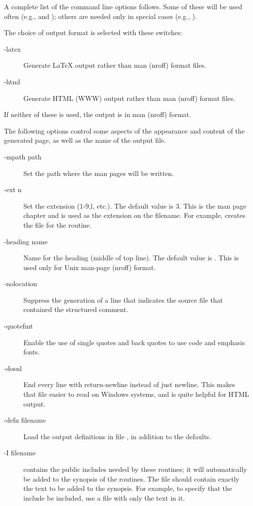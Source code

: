 \documentclass[twoside]{linfoem}
\begin{document}
A complete list of the command line options follows.  Some of these will
be used often (e.g.,  and ); others are
needed only in special cases (e.g., ).

The choice of output format is selected with these switches:
\begin{description}
\item[-latex]
Generate LaTeX output rather than man (nroff) format files.
\item[-html]
Generate HTML (WWW) output rather than man (nroff) format files.
\end{description}
If neither of these is used, the output is in man (nroff) format.

The following options control some aspects of the appearance and content of the
generated page, as well as the name of the output file.
\begin{description}
\item[-mpath path]
Set the path where the man pages will be written.
\item[-ext n]
Set the extension (1-9,l, etc.).  The default value is 3.  This is the man page
chapter and is used as the extension on the filename.  For example,
 creates the file  for the  routine.
\item[-heading name]
Name for the heading (middle of top line).  The default value is .
This is used only for Unix man-page (nroff) format.
\item[-nolocation]
Suppress the generation of a line that indicates the source file that
contained the structured comment.
\item[-quotefmt]
Enable the use of single quotes and back quotes to use code and emphasis
fonts.
\item[-dosnl]
End every line with return-newline instead of just newline.  This makes that
file easier to read on Windows systems, and is quite helpful for HTML output.
\item[-defn filename]Load the output definitions in file , in
  addition to the defaults.  
\item[-I filename]
 contains the public includes needed by these routines; it will
automatically be added to the synopsis of the routines.  The file should
contain exactly the text to be added to the synopsis.  For example, to specify
that the include  be included, use a file with only the text
 in it.
\end{description}
\end{document}

